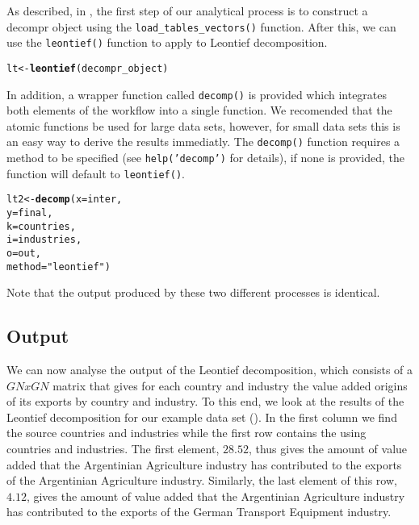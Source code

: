 \documentclass[a4paper]{article}\usepackage[]{graphicx}\usepackage[]{color}
\makeatletter
\newcommand{\hlstr}[1]{\textcolor[rgb]{0.192,0.494,0.8}{#1}}%
\newcommand{\hlstd}[1]{\textcolor[rgb]{0.345,0.345,0.345}{#1}}%
\newcommand{\hlkwb}[1]{\textcolor[rgb]{0.69,0.353,0.396}{#1}}%
\newcommand{\hlkwc}[1]{\textcolor[rgb]{0.333,0.667,0.333}{#1}}%
\newcommand{\hlkwd}[1]{\textcolor[rgb]{0.737,0.353,0.396}{\textbf{#1}}}%
\newenvironment{kframe}{%
 \def\at@end@of@kframe{}%
 \ifinner\ifhmode%
  \def\at@end@of@kframe{\end{minipage}}%
  \begin{minipage}{\columnwidth}%
 \fi\fi%
 \def\FrameCommand##1{\hskip\@totalleftmargin \hskip-\fboxsep
 \colorbox{shadecolor}{##1}\hskip-\fboxsep
     \hskip-\linewidth \hskip-\@totalleftmargin \hskip\columnwidth}%
 \MakeFramed {\advance\hsize-\width
   \@totalleftmargin\z@ \linewidth\hsize
   \@setminipage}}%
 {\par\unskip\endMakeFramed%
 \at@end@of@kframe}
\newenvironment{knitrout}{}{} %
\newcommand{\code}[1]{\texttt{#1}}
\makeatother
\begin{document}
As described, in , the first step of our analytical
process is to construct a decompr object using the \code{load\_tables\_vectors()}
function. After this, we can use the \code{leontief()} function to
apply to Leontief decomposition. 

\begin{knitrout}
\color{fgcolor}\begin{kframe}
\begin{alltt}
\hlstd{lt} \hlkwb{<-} \hlkwd{leontief}\hlstd{( decompr_object )}
\end{alltt}
\end{kframe}
\end{knitrout}

In addition, a wrapper function called \code{decomp()} is provided
which integrates both elements of the workflow into a single function.
We recomended that the atomic functions be used for large data sets,
however, for small data sets this is an easy way to derive the results
immediatly. The \code{decomp()} function requires a method to be
specified (see \code{help('decomp')} for details), if none is provided,
the function will default to \code{leontief()}.

\begin{knitrout}
\color{fgcolor}\begin{kframe}
\begin{alltt}
\hlstd{lt2} \hlkwb{<-} \hlkwd{decomp}\hlstd{(} \hlkwc{x} \hlstd{= inter,}
               \hlkwc{y} \hlstd{= final,}
               \hlkwc{k} \hlstd{= countries,}
               \hlkwc{i} \hlstd{= industries,}
               \hlkwc{o} \hlstd{= out,}
               \hlkwc{method} \hlstd{=} \hlstr{"leontief"} \hlstd{)}
\end{alltt}
\end{kframe}
\end{knitrout}

Note that the output produced by these two different processes is
identical.

\subsection{Output}

We can now analyse the output of the Leontief decomposition, which
consists of a $GNxGN$ matrix that gives for each country and industry
the value added origins of its exports by country and industry. To
this end, we look at the results of the Leontief decomposition for
our example data set (). In the first column
we find the source countries and industries while the first row contains
the using countries and industries. The first element, $28.52$, thus
gives the amount of value added that the Argentinian Agriculture industry
has contributed to the exports of the Argentinian Agriculture industry.
Similarly, the last element of this row, $4.12$, gives the amount
of value added that the Argentinian Agriculture industry has contributed
to the exports of the German Transport Equipment industry.
\end{document}
